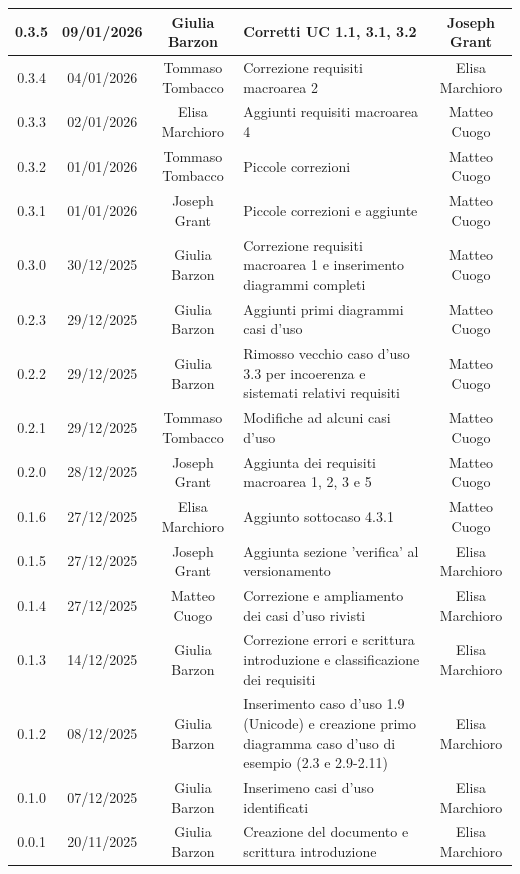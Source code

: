 \documentclass[11pt,a4paper]{article}
\begin{document}
\begin{longtable}[H]{|c|c|c|>{\raggedright\arraybackslash}p{}|c|}
        \hline
        0.3.5 & 09/01/2026 & Giulia Barzon & Corretti UC 1.1, 3.1, 3.2 & Joseph Grant\\
        \hline
        0.3.4 & 04/01/2026 & Tommaso Tombacco & Correzione requisiti macroarea 2 & Elisa Marchioro\\
        \hline
        0.3.3 & 02/01/2026 & Elisa Marchioro & Aggiunti requisiti macroarea 4 &  Matteo Cuogo\\
        \hline
        0.3.2 & 01/01/2026 & Tommaso Tombacco & Piccole correzioni & Matteo Cuogo\\
        \hline
        0.3.1 & 01/01/2026 & Joseph Grant & Piccole correzioni e aggiunte &  Matteo Cuogo\\
        \hline
        0.3.0 & 30/12/2025 & Giulia Barzon & Correzione requisiti macroarea 1 e inserimento diagrammi completi & Matteo Cuogo \\
        \hline
        0.2.3 & 29/12/2025 & Giulia Barzon & Aggiunti primi diagrammi casi d'uso &  Matteo Cuogo \\
        \hline
        0.2.2 & 29/12/2025 & Giulia Barzon & Rimosso vecchio caso d'uso 3.3 per incoerenza e sistemati relativi requisiti & Matteo Cuogo \\
        \hline
        0.2.1 & 29/12/2025 & Tommaso Tombacco & Modifiche ad alcuni casi d'uso &  Matteo Cuogo\\ 
        \hline
        0.2.0 & 28/12/2025 & Joseph Grant & Aggiunta dei requisiti macroarea 1, 2, 3 e 5 &  Matteo Cuogo\\ 
        \hline
        0.1.6 & 27/12/2025 & Elisa Marchioro & Aggiunto sottocaso 4.3.1 & Matteo Cuogo\\ 
        \hline
        0.1.5 & 27/12/2025 & Joseph Grant & Aggiunta sezione 'verifica' al versionamento & Elisa Marchioro\\ 
        \hline
        0.1.4 & 27/12/2025 & Matteo Cuogo & Correzione e ampliamento dei casi d'uso rivisti & Elisa Marchioro\\
        \hline
        0.1.3 & 14/12/2025 & Giulia Barzon & Correzione errori e scrittura introduzione e classificazione dei requisiti & Elisa Marchioro\\
        \hline
        0.1.2 & 08/12/2025 & Giulia Barzon & Inserimento caso d'uso 1.9 (Unicode) e creazione primo diagramma caso d'uso di esempio (2.3 e 2.9-2.11) & Elisa Marchioro\\
        \hline
        0.1.0 & 07/12/2025 & Giulia Barzon & Inserimeno casi d'uso identificati & Elisa Marchioro\\
        \hline
        0.0.1 & 20/11/2025 & Giulia Barzon & Creazione del documento e scrittura introduzione & Elisa Marchioro\\
        \hline
\end{longtable}
\end{document}

